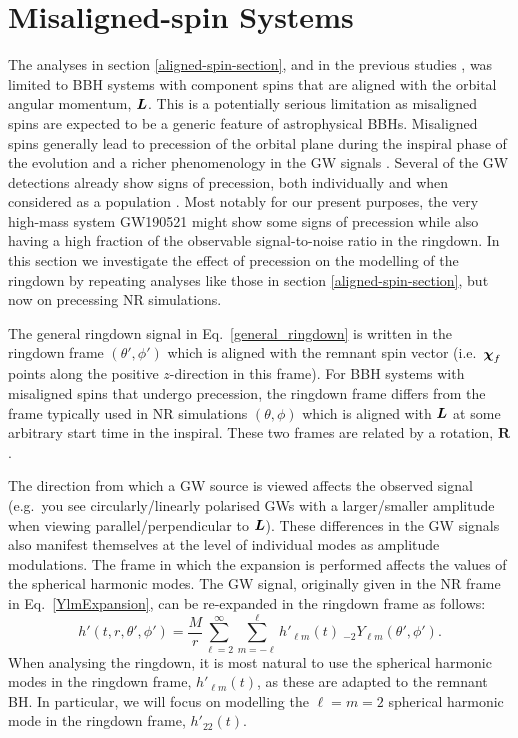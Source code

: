 \section{Misaligned-spin Systems}\label{misaligned-spin-section}

The analyses in section \ref{aligned-spin-section}, and in the previous studies \cite{Flanagan:1997sx, Berti:2007fi, Kamaretsos:2011um, London:2014cma, Carullo:2018sfu, Bhagwat:2017tkm, Giesler:2019uxc, Ota:2019bzl, Dhani:2020nik}, was limited to BBH systems with component spins that are aligned with the orbital angular momentum, $\vb*{L}$.
This is a potentially serious limitation as misaligned spins are expected to be a generic feature of astrophysical BBHs.
Misaligned spins generally lead to precession of the orbital plane during the inspiral phase of the evolution and a richer phenomenology in the GW signals \cite{Apostolatos:1994mx}.
Several of the GW detections already show signs of precession, both individually \cite{LIGOScientific:2020ibl, Gerosa:2020aiw} and when considered as a population \cite{LIGOScientific:2020kqk}.
Most notably for our present purposes, the very high-mass system GW190521 \cite{LIGOScientific:2020iuh, LIGOScientific:2020ufj} might show some signs of precession while also having a high fraction of the observable signal-to-noise ratio in the ringdown. 
In this section we investigate the effect of precession on the modelling of the ringdown by repeating analyses like those in section \ref{aligned-spin-section}, but now on precessing NR simulations.

The general ringdown signal in Eq.~\ref{general_ringdown} is written in the ringdown frame $(\theta', \phi')$ which is aligned with the remnant spin vector (i.e.\ $\vb*{\chi}_f$ points along the positive $z$-direction in this frame). For BBH systems with misaligned spins that undergo precession, the ringdown frame differs from the frame typically used in NR simulations $(\theta, \phi)$ which is aligned with $\vb*{L}$ at some arbitrary start time in the inspiral.
These two frames are related by a rotation, $\mathbf{R}$.

The direction from which a GW source is viewed affects the observed signal 
(e.g.\ you see circularly/linearly polarised GWs with a larger/smaller amplitude when viewing parallel/perpendicular to $\vb*{L}$).
These differences in the GW signals also manifest themselves at the level of individual modes as amplitude modulations. The frame in which the expansion is performed affects the values of the spherical harmonic modes. 
The GW signal, originally given in the NR frame in Eq.~\ref{YlmExpansion}, can be re-expanded in the ringdown frame as follows:
\begin{equation}\label{hprimedecomp}
    h'(t, r, \theta', \phi') = \frac{M}{r} \sum_{\ell = 2}^{\infty} \sum_{m = -\ell}^{\ell}  h'_{\ell m}(t) ~ {}_{-2}Y_{\ell m}(\theta', \phi').
\end{equation}
When analysing the ringdown, it is most natural to use the spherical harmonic modes in the ringdown frame, $h'_{\ell m}(t)$, as these are adapted to the remnant BH. 
In particular, we will focus on modelling the $\ell = m = 2$ spherical harmonic mode in the ringdown frame, $h'_{22}(t)$.

